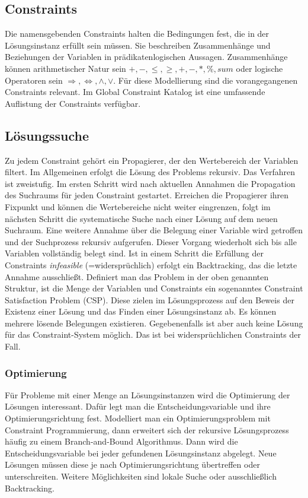 \subsection{Constraints}
Die namensgebenden Constraints halten die Bedingungen fest, die in der Lösungsinstanz erfüllt sein müssen. Sie beschreiben Zusammenhänge und Beziehungen der Variablen in prädikatenlogischen Aussagen.\newline
Zusammenhänge können arithmetischer Natur sein $ +, -, \le, \ge, +, -, * , \%, sum$ oder logische Operatoren sein $\Rightarrow, \Leftrightarrow, \wedge, \vee $.
Für diese Modellierung sind die vorangegangenen Constraints relevant. Im Global Constraint Katalog \cite{GlobalConstraintWeb} ist eine umfassende Auflistung der Constraints verfügbar. 
\subsection{Lösungssuche}
Zu jedem Constraint gehört ein Propagierer, der den Wertebereich der Variablen filtert. Im Allgemeinen erfolgt die Lösung des Problems rekursiv. Das Verfahren ist zweistufig. Im ersten Schritt wird nach aktuellen Annahmen die Propagation des Suchraums für jeden Constraint gestartet. Erreichen die Propagierer ihren Fixpunkt und können die Wertebereiche nicht weiter eingrenzen, folgt im nächsten Schritt die systematische Suche nach einer Lösung auf dem neuen Suchraum. Eine weitere Annahme über die Belegung einer Variable wird getroffen und der Suchprozess rekursiv aufgerufen. Dieser Vorgang wiederholt sich bis alle Variablen vollständig belegt sind. Ist in einem Schritt die Erfüllung der Constraints \textit{infeasible} (=widersprüchlich) erfolgt ein Backtracking, das die letzte Annahme ausschließt.
Definiert man das Problem in der oben genannten Struktur, ist die Menge der Variablen und Constraints ein sogenanntes Constraint Satisfaction Problem (CSP). Diese zielen im Lösungsprozess auf den Beweis der Existenz einer Lösung und das Finden einer Lösungsinstanz ab. Es können mehrere lösende Belegungen existieren. Gegebenenfalls ist aber auch keine Lösung für das Constraint-System möglich. Das ist bei widersprüchlichen Constraints der Fall. 

\subsubsection{Optimierung}
Für Probleme mit einer Menge an Lösungsinstanzen wird die Optimierung der Lösungen interessant. Dafür legt man die Entscheidungsvariable und ihre Optimierungsrichtung fest. 
Modelliert man ein Optimierungsproblem mit Constraint Programmierung, dann erweitert sich der rekursive Lösungsprozess häufig zu einem Branch-and-Bound Algorithmus. Dann wird die Entscheidungsvariable bei jeder gefundenen Lösungsinstanz abgelegt. Neue Lösungen müssen diese je nach Optimierungsrichtung übertreffen oder unterschreiten.
Weitere Möglichkeiten sind lokale Suche oder ausschließlich Backtracking.


